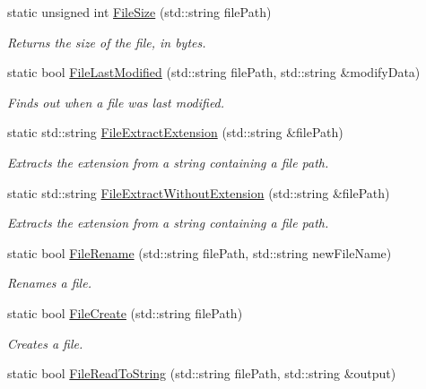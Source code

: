 \begin{DoxyCompactItemize}
static unsigned int \hyperlink{classDCEngine_1_1FileSystem_ab09594bacb1caa0839c95769a480c407}{File\-Size} (std\-::string file\-Path)
\begin{DoxyCompactList}\small\item\em Returns the size of the file, in bytes. \end{DoxyCompactList}\item 
static bool \hyperlink{classDCEngine_1_1FileSystem_a4026bf77a0c276f3ba28d2091dd4cae0}{File\-Last\-Modified} (std\-::string file\-Path, std\-::string \&modify\-Data)
\begin{DoxyCompactList}\small\item\em Finds out when a file was last modified. \end{DoxyCompactList}\item 
static std\-::string \hyperlink{classDCEngine_1_1FileSystem_a05b0b00e7ee58b64c6f6e8b801e1f6b5}{File\-Extract\-Extension} (std\-::string \&file\-Path)
\begin{DoxyCompactList}\small\item\em Extracts the extension from a string containing a file path. \end{DoxyCompactList}\item 
static std\-::string \hyperlink{classDCEngine_1_1FileSystem_a84d18126617852c9c80cab7e8e5bb641}{File\-Extract\-Without\-Extension} (std\-::string \&file\-Path)
\begin{DoxyCompactList}\small\item\em Extracts the extension from a string containing a file path. \end{DoxyCompactList}\item 
static bool \hyperlink{classDCEngine_1_1FileSystem_a46229a4c969c994d1bf9a9a4a58d344d}{File\-Rename} (std\-::string file\-Path, std\-::string new\-File\-Name)
\begin{DoxyCompactList}\small\item\em Renames a file. \end{DoxyCompactList}\item 
static bool \hyperlink{classDCEngine_1_1FileSystem_acaefff93558af4dd5509311ebf0705d3}{File\-Create} (std\-::string file\-Path)
\begin{DoxyCompactList}\small\item\em Creates a file. \end{DoxyCompactList}\item 
static bool \hyperlink{classDCEngine_1_1FileSystem_aca02529d544f0b818c78b835c414500c}{File\-Read\-To\-String} (std\-::string file\-Path, std\-::string \&output)

\end{DoxyCompactItemize}
